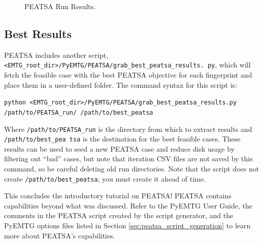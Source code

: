 \documentclass[11pt]{article}
\begin{document}
\begin{figure}[H]
	\centering
	\caption{\label{fig:run_results}\ac{PEATSA} Run Results.}
\end{figure}


\subsection{Best Results}
\label{sec:best_results}

\noindent\ac{PEATSA} includes another script, \texttt{<EMTG\_root\_dir>/PyEMTG/PEATSA/grab\_best\_peatsa\_results. py}, which will fetch the feasible case with the best \ac{PEATSA} objective for each fingerprint and place them in a user-defined folder. The command syntax for this script is:

\texttt{python <EMTG\_root\_dir>/PyEMTG/PEATSA/grab\_best\_peatsa\_results.py /path/to/PEATSA\newline\indent\_run/ /path/to/best\_peatsa}

\noindent Where \texttt{/path/to/PEATSA\_run} is the directory from which to extract results and \texttt{/path/to/best\_pea tsa} is the destination for the best feasible cases. These results can be used to seed a new \ac{PEATSA} case and reduce disk usage by filtering out ``bad'' cases, but note that iteration CSV files are not saved by this command, so be careful deleting old run directories. Note that the script does not create \texttt{/path/to/best\_peatsa}; you must create it ahead of time.

\noindent This concludes the introductory tutorial on \ac{PEATSA}! \ac{PEATSA} contains capabilities beyond what was discussed. Refer to the PyEMTG User Guide, the comments in the \ac{PEATSA} script created by the script generator, and the PyEMTG options files listed in Section \ref{sec:peatsa_script_generation} to learn more about PEATSA’s capabilities.
\end{document}
